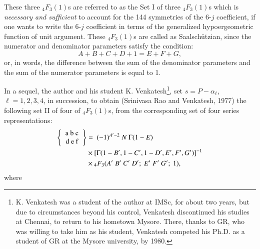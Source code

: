 These three ${}_4F_3(1)$s are referred to as the Set I of three ${}_4F_3(1)$s which is \textit{necessary and sufficient} to account for the 144 symmetries of the 6-$j$ coefficient, if one wants to write the 6-$j$ coefficient in terms of the generalized hypoergeometric function of unit argument. These ${}_4F_3(1)$s are called as Saalschützian, since the numerator and denominator parameters satisfy the condition:
\begin{equation}
A+B+C+D+1 = E+F+G, \label{chap29-eq36}
\end{equation}
or, in words, the difference between the sum of the denominator parameters and the sum of the numerator parameters is equal to 1.

In a sequel, the author and his student K. Venkatesh\footnote{K. Venkatesh was a student of the author at IMSc, for about two years, but due to circumstances beyond his control, Venkatesh discontinued his studies at Chennai, to return to his hometown Mysore. There, thanks to GR, who was willing to take him as his student, Venkatesh competed his Ph.D. as a student of GR at the Mysore university, by 1980.}, set $s = P-\alpha_\ell$, $\ell=1,2,3,4$, in succession, to obtain (Srinivasa Rao and Venkatesh, 1977) the following set II of four of $_4F_3(1)$s, from the corresponding set of four series representations:
\begin{equation}
\begin{split}
\left\{
\begin{tabular} {c} 
a\ b\ c\\ 
d\ e\ f \\ 
\end{tabular} 
\right\}
& = \ (-1)^{A'-2}\ N\ \Gamma(1-E)\\
& \times [\Gamma(1-B', 1-C', 1-D', E', F', G')]^{-1}\\
& \times {}_4F_3(A'\ B'\ C'\ D';\ E'\ F'\ G';\ 1), \label{chap29-eq37}
\end{split}
\end{equation}
where
